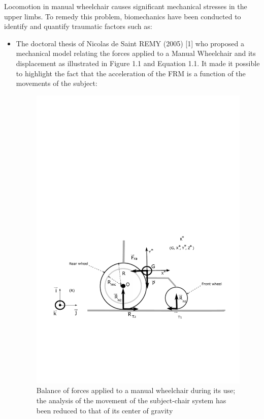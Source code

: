 Locomotion in manual wheelchair causes significant mechanical stresses in the upper limbs. To remedy this problem, biomechanics have been conducted to identify and quantify traumatic factors such as:
\begin{itemize}
\item The doctoral thesis of Nicolas de Saint REMY (2005) [1] who proposed a
mechanical model relating the forces applied to a Manual Wheelchair and its displacement as illustrated in Figure 1.1 and Equation 1.1. It made it possible to highlight the fact that the acceleration of the FRM is a function of the movements of the subject:

\begin{figure}[h]
\center
\includegraphics[scale = 0.7]{images/wheelchairModel}
\caption{Balance of forces applied to a manual wheelchair during its use; the analysis of the movement of the subject-chair system has been reduced to that of its center of gravity }
\label{Wheelchair_model}
\end{figure}


\end{itemize}

